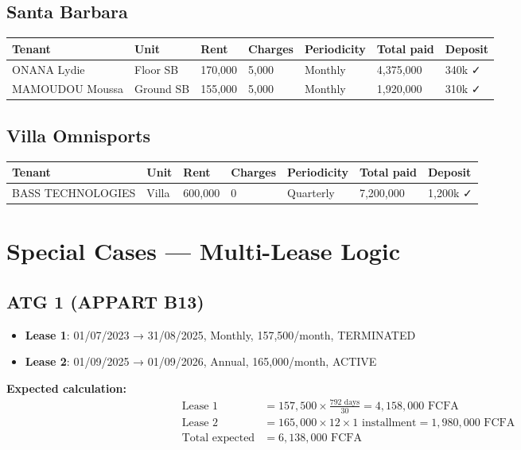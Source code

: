 \documentclass[a4paper,11pt]{article}
\begin{document}
\subsection{Santa Barbara}

\begin{longtable}{|p{3.5cm}|p{3cm}|p{1.5cm}|p{1.5cm}|p{2cm}|p{2cm}|p{2cm}|}
\hline
\textbf{Tenant} & \textbf{Unit} & \textbf{Rent} & \textbf{Charges} & \textbf{Periodicity} & \textbf{Total paid} & \textbf{Deposit} \\
\hline
ONANA Lydie & Floor SB & 170,000 & 5,000 & Monthly & 4,375,000 & 340k ✓ \\
\hline
MAMOUDOU Moussa & Ground SB & 155,000 & 5,000 & Monthly & 1,920,000 & 310k ✓ \\
\hline
\end{longtable}

\subsection{Villa Omnisports}

\begin{longtable}{|p{4cm}|p{2cm}|p{1.5cm}|p{1.5cm}|p{2.5cm}|p{2cm}|p{2cm}|}
\hline
\textbf{Tenant} & \textbf{Unit} & \textbf{Rent} & \textbf{Charges} & \textbf{Periodicity} & \textbf{Total paid} & \textbf{Deposit} \\
\hline
BASS TECHNOLOGIES & Villa & 600,000 & 0 & Quarterly & 7,200,000 & 1,200k ✓ \\
\hline
\end{longtable}

\section{Special Cases — Multi-Lease Logic}

\subsection{ATG 1 (APPART B13)}

\begin{itemize}
  \item \textbf{Lease 1}: 01/07/2023 → 31/08/2025, Monthly, 157,500/month, TERMINATED
  \item \textbf{Lease 2}: 01/09/2025 → 01/09/2026, Annual, 165,000/month, ACTIVE
\end{itemize}

\textbf{Expected calculation:}
\begin{align*}
\text{Lease 1} &= 157{,}500 \times \frac{792 \text{ days}}{30} = 4{,}158{,}000 \text{ FCFA} \\
\text{Lease 2} &= 165{,}000 \times 12 \times 1 \text{ installment} = 1{,}980{,}000 \text{ FCFA} \\
\text{Total expected} &= 6{,}138{,}000 \text{ FCFA}
\end{align*}
\end{document}
